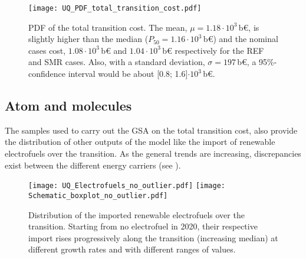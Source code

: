 \begin{figure}[htbp!]
\centering
\texttt{[image: UQ\_PDF\_total\_transition\_cost.pdf]}
\caption{\acrfull{PDF} of the total transition cost. The mean, $\mu=1.18\cdot10^3$\,b€, is slightly higher than the median ($P_{50}=1.16\cdot10^3$\,b€) and the nominal cases cost, $1.08\cdot10^3$\,b€ and $1.04\cdot10^3$\,b€ respectively for the REF and SMR cases. Also, with a standard deviation, $\sigma=197$\,b€, a 95\%-confidence interval would be about [0.8; 1.6]$\cdot10^3$\,b€.}
\label{fig:UQ_PDF_total_transition_cost}
\end{figure}

\subsection{Atom and molecules}
\label{subsec:atom_mol:results_atom_mol}
The samples used to carry out the \gls{GSA} on the total transition cost, also provide the distribution of other outputs of the model like the import of renewable electrofuels over the transition. As the general trends are increasing, discrepancies exist between the different energy carriers (see ).
%

\begin{figure}[htbp!]
\centering
\texttt{[image: UQ\_Electrofuels\_no\_outlier.pdf]}
\texttt{[image: Schematic\_boxplot\_no\_outlier.pdf]}
\caption{Distribution of the imported renewable electrofuels over the transition. Starting from no electrofuel in 2020, their respective import rises progressively along the transition (\ie increasing median) at different growth rates and with different ranges of values. }
\label{fig:results_uq_electrofuels}
\end{figure}

